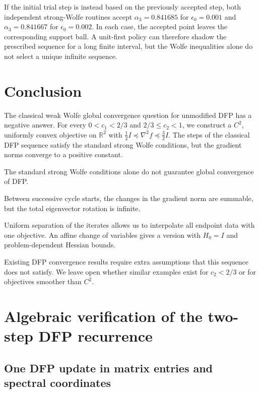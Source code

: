 \documentclass[11pt]{article}
\newcommand{\R}{\mathbb R}
\begin{document}
If the initial trial step is instead based on the previously accepted step,
both independent strong-Wolfe routines accept $\alpha_3=0.841685$ for
$\epsilon_0=0.001$ and $\alpha_3=0.841667$ for $\epsilon_0=0.002$.  In each
case, the accepted point leaves the corresponding support ball.  A unit-first
policy can therefore shadow the prescribed sequence for a long finite
interval, but the Wolfe inequalities alone do not select a unique infinite
sequence.



\section{Conclusion}
\label{sec:conclusion}

The classical weak Wolfe global convergence question for unmodified DFP has a
negative answer.  For every $0<c_1<2/3$ and $2/3\le c_2<1$, we construct a
$C^2$, uniformly convex objective on $\R^2$ with
$\frac12I\preceq\nabla^2f\preceq\frac32I$.  The steps of the classical DFP
sequence satisfy the standard strong Wolfe conditions, but the gradient norms
converge to a positive constant.

The standard strong Wolfe conditions alone do not guarantee global convergence of DFP.

Between successive
cycle starts, the changes in the gradient norm are summable, but the total
eigenvector rotation is infinite.

Uniform separation of the iterates allows
us to interpolate all endpoint data with one objective.  An affine change of
variables gives a version with $H_0=I$ and problem-dependent Hessian bounds.

Existing DFP convergence results require extra assumptions that this sequence
does not satisfy.  We leave open whether similar examples exist for $c_2<2/3$
or for objectives smoother than $C^2$.

\appendix

\section{Algebraic verification of the two-step DFP recurrence}
\label{app:algebra}

\subsection{One DFP update in matrix entries and spectral coordinates}
\end{document}
